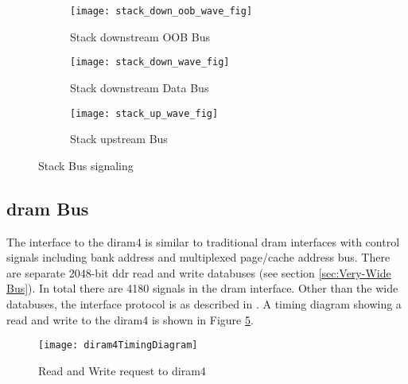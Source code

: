 \begin{figure}
\centering
\begin{subfigure}{.9\textwidth}
  \centering
  \texttt{[image: stack\_down\_oob\_wave\_fig]}
  \captionsetup{justification=centering, skip=10pt}
  \caption{Stack downstream OOB Bus}
  \label{fig:Stack downstream OOB Bus}
\end{subfigure}%

\bigskip

\begin{subfigure}{.9\textwidth}
  \centering
  \texttt{[image: stack\_down\_wave\_fig]}
  \captionsetup{justification=centering, skip=10pt}
  \caption{Stack downstream Data Bus}
  \label{fig:Stack downstream Data Bus}
\end{subfigure}%

\bigskip

\begin{subfigure}{.9\textwidth}
  \centering
  \texttt{[image: stack\_up\_wave\_fig]}
  \captionsetup{justification=centering, skip=10pt}
  \caption{Stack upstream Bus}
  \label{fig:Stack upstream Bus}
\end{subfigure}%

\captionsetup{justification=centering, skip=16pt}
\caption{Stack Bus signaling}
\label{fig:Stack Bus signalling}
\end{figure}


\subsection{\ac{dram} Bus}
\label{sec:DRAM Bus}

The interface to the \ac{diram4} is similar to traditional \ac{dram} interfaces with control signals including bank address and multiplexed page/cache address bus.
There are separate 2048-bit \ac{ddr} read and write databuses (see section \ref{sec:Very-Wide Bus}).
In total there are 4180 signals in the \ac{dram} interface.
Other than the wide databuses, the interface protocol is as described in \cite{tezzaron:diram4}.
A timing diagram showing a read and write to the \ac{diram4} is shown in Figure \ref{fig:diram4Timing}.
\begin{figure}[!t]
\centering
\captionsetup{justification=centering}
\captionsetup{width=.9\linewidth}
\centerline{
\mbox{\texttt{[image: diram4TimingDiagram]}}
}
\caption{Read and Write request to \ac{diram4} \cite{tezzaron:diram4}}
\label{fig:diram4Timing}
\end{figure}



